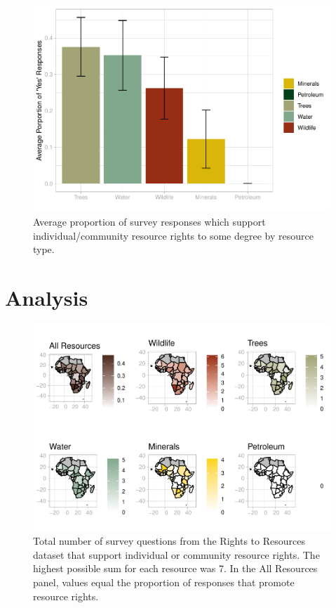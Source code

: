 \documentclass[
  12pt,
]{article}
\begin{document}
\begin{figure}
\centering
\includegraphics{FinalProject_Myers_files/figure-latex/fig1-1.pdf}
\caption{Average proportion of survey responses which support
individual/community resource rights to some degree by resource type.}
\end{figure}

\newpage

\hypertarget{analysis}{%
\section{Analysis}\label{analysis}}

\begin{figure}
\centering
\includegraphics{FinalProject_Myers_files/figure-latex/unnamed-chunk-9-1.pdf}
\caption{Total number of survey questions from the Rights to Resources
dataset that support individual or community resource rights. The
highest possible sum for each resource was 7. In the All Resources
panel, values equal the proportion of responses that promote resource
rights.}
\end{figure}
\end{document}
